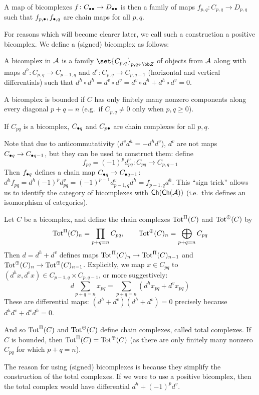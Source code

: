 A map of bicomplexes $f\colon C_{\bullet\bullet}\to D_{\bullet\bullet}$ is then a family of maps $f_{p,q}\colon C_{p,q}\to D_{p,q}$ such that $f_{p,\bullet},f_{\bullet,q}$ are chain maps for all $p,q$.

For reasons which will become clearer later, we call such a construction a {\emphcolor positive bicomplex}.
We define a (signed) bicomplex as follows:

\bdefn

    A {\emphcolor bicomplex} in ${{\cal A}}$ is a family $\set{C_{p,q}}_{p,q\in\bZ}$ of objects from ${{\cal A}}$ along with maps $d^h\colon C_{p,q}\to C_{p-1,q}$ and $d^v\colon C_{p,q}\to C_{p,q-1}$ (horizontal and
    vertical differentials) such that $d^h\circ d^h=d^v\circ d^v=d^v\circ d^h+d^h\circ d^v=0$.

    A bicomplex is {\emphcolor bounded} if $C$ has only finitely many nonzero components along every diagonal $p+q=n$ (e.g.\ if $C_{p,q}\neq0$ only when $p,q\geq0$).

\edefn

If $C_{pq}$ is a bicomplex, $C_{\bullet q}$ and $C_{p\bullet}$ are chain complexes for all $p,q$.

Note that due to anticommutativity ($d^vd^h=-d^hd^v$), $d^v$ are not maps $C_{\bullet q}\to C_{\bullet q-1}$, but they can be used to construct them: define
$$ f_{pq} = (-1)^pd^v_{pq}\colon C_{pq}\to C_{p,q-1} $$
Then $f_{\bullet q}$ defines a chain map $C_{\bullet q}\to C_{\bullet q-1}$: $d^hf_{pq}=d^h(-1)^pd^v_{pq}=(-1)^{p-1}d^v_{p-1,q}d^h=f_{p-1,q}d^h$.
This ``sign trick'' allows us to identify the category of bicomplexes with ${\sf Ch}({\sf Ch}({{\cal A}}))$ (i.e.\ this defines an isomorphism of categories).

Let $C$ be a bicomplex, and define the chain complexes ${\rm Tot}^\Pi(C)$ and ${\rm Tot}^\oplus(C)$ by
$$ {\rm Tot}^\Pi(C)_n = \prod_{p+q=n}C_{pq},\qquad {\rm Tot}^\oplus(C)_n = \bigoplus_{p+q=n}C_{pq} $$
Then $d=d^h+d^v$ defines maps ${\rm Tot}^\Pi(C)_n\to{\rm Tot}^\Pi(C)_{n-1}$ and ${\rm Tot}^\oplus(C)_n\to{\rm Tot}^\oplus(C)_{n-1}$.
Explicitly, we map $x\in C_{pq}$ to $(d^hx,d^vx)\in C_{p-1,q}\times C_{p,q-1}$, or more suggestively:
$$ d\sum_{p+q=n}x_{pq} = \sum_{p+q=n}(d^hx_{pq}+d^vx_{pq}) $$
These are differential maps: $(d^h+d^v)(d^h+d^v)=0$ precisely because $d^hd^v+d^vd^h=0$.

And so ${\rm Tot}^\Pi(C)$ and ${\rm Tot}^\oplus(C)$ define chain complexes, called {\emphcolor total complexes}.
If $C$ is bounded, then ${\rm Tot}^\Pi(C)={\rm Tot}^\oplus(C)$ (as there are only finitely many nonzero $C_{pq}$ for which $p+q=n$).

The reason for using (signed) bicomplexes is because they simplify the construction of the total complexes.
If we were to use a positive bicomplex, then the total complex would have differential $d^h+(-1)^pd^v$.

